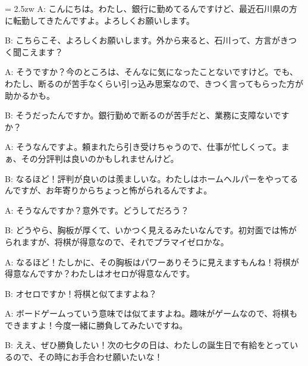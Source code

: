 \documentclass[11pt]{amsart}
\title{}
\author{}
\newenvironment{hangall}[1]{\hangindent = 2.5zw\everypar{\hangindent = 2.5zw}}{}
\begin{document}
\maketitle
\begin{hangall}{}%
A: こんにちは。わたし、銀行に勤めてるんですけど、最近石川県の方に転勤してきたんですよ。よろしくお願いします。

B: こちらこそ、よろしくお願いします。外から来ると、石川って、方言がきつく聞こえます？

A: そうですか？今のところは、そんなに気になったことないですけど。でも、わたし、断るのが苦手なくらい引っ込み思案なので、きつく言ってもらった方が助かるかも。

B: そうだったんですか。銀行勤めで断るのが苦手だと、業務に支障ないですか？

A: そうなんですよ。頼まれたら引き受けちゃうので、仕事が忙しくって。まぁ、その分評判は良いのかもしれませんけど。

B: なるほど！評判が良いのは羨ましいな。わたしはホームヘルパーをやってるんですが、お年寄りからちょっと怖がられるんですよ。

A: そうなんですか？意外です。どうしてだろう？

B: どうやら、胸板が厚くて、いかつく見えるみたいなんです。初対面では怖がられますが、将棋が得意なので、それでプラマイゼロかな。

A: なるほど！たしかに、その胸板はパワーありそうに見えますもんね！将棋が得意なんですか？わたしはオセロが得意なんです。

B: オセロですか！将棋と似てますよね？

A: ボードゲームっていう意味では似てますよね。趣味がゲームなので、将棋もできますよ！今度一緒に勝負してみたいですね。

B: ええ、ぜひ勝負したい！次の七夕の日は、わたしの誕生日で有給をとっているので、その時にお手合わせ願いたいな！
\end{hangall}
\end{document}
